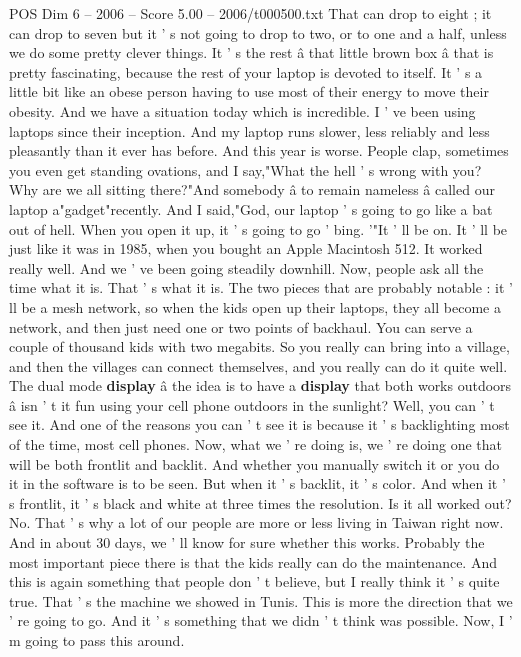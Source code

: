 \begin{textsample}{POS Dim 6 – 2006 – Score 5.00 – 2006/t000500.txt}
That can drop to eight ; it can drop to seven but it ' s not going to drop to two, or to one and a half, unless we do some pretty clever things.
It ' s the rest â that little brown box â that is pretty fascinating, because the rest of your laptop is devoted to itself.
It ' s a little bit like an obese person having to use most of their energy to move their obesity.
And we have a situation today which is incredible.
I ' ve been using laptops since their inception.
And my laptop runs slower, less reliably and less pleasantly than it ever has before.
And this year is worse.
People clap, sometimes you even get standing ovations, and I say,"What the hell ' s wrong with you?
Why are we all sitting there?"And somebody â to remain nameless â called our laptop a"gadget"recently.
And I said,"God, our laptop ' s going to go like a bat out of hell.
When you open it up, it ' s going to go ' bing. '"It ' ll be on.
It ' ll be just like it was in 1985, when you bought an Apple Macintosh 512.
It worked really well.
And we ' ve been going steadily downhill.
Now, people ask all the time what it is.
That ' s what it is.
The two pieces that are probably notable : it ' ll be a mesh network, so when the kids open up their laptops, they all become a network, and then just need one or two points of backhaul.
You can serve a couple of thousand kids with two megabits.
So you really can bring into a village, and then the villages can connect themselves, and you really can do it quite well.
The dual mode \textbf{display} â the idea is to have a \textbf{display} that both works outdoors â isn ' t it fun using your cell phone outdoors in the sunlight?
Well, you can ' t see it.
And one of the reasons you can ' t see it is because it ' s backlighting most of the time, most cell phones.
Now, what we ' re doing is, we ' re doing one that will be both frontlit and backlit.
And whether you manually switch it or you do it in the software is to be seen.
But when it ' s backlit, it ' s color.
And when it ' s frontlit, it ' s black and white at three times the resolution.
Is it all worked out?
No.
That ' s why a lot of our people are more or less living in Taiwan right now.
And in about 30 days, we ' ll know for sure whether this works.
Probably the most important piece there is that the kids really can do the maintenance.
And this is again something that people don ' t believe, but I really think it ' s quite true.
That ' s the machine we showed in Tunis.
This is more the direction that we ' re going to go.
And it ' s something that we didn ' t think was possible.
Now, I ' m going to pass this around.

\end{textsample}
